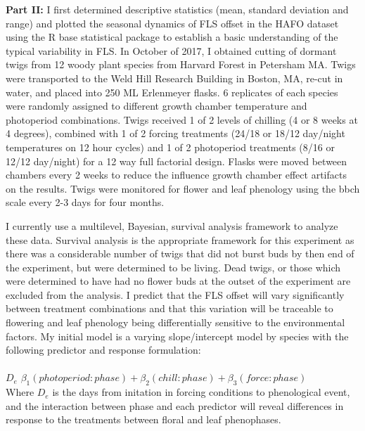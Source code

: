\documentclass{article}\usepackage[]{graphicx}\usepackage[]{color}
\begin{document}
\indent\textbf{Part II:} I first determined descriptive statistics (mean, standard deviation and range) and plotted the seasonal dynamics of FLS offset in the HAFO dataset using the R base statistical package to establish a basic understanding of the typical variability in FLS. In October of 2017, I obtained cutting of dormant twigs from 12 woody plant species from Harvard Forest in Petersham MA. Twigs were transported to the Weld Hill Research Building in Boston, MA, re-cut in water, and placed into 250 ML Erlenmeyer flasks. 6 replicates of each species were randomly assigned to different growth chamber temperature and photoperiod combinations. Twigs received 1 of 2 levels of chilling (4 or 8 weeks at 4 degrees), combined with 1 of 2 forcing treatments (24/18 or 18/12 day/night temperatures on 12 hour cycles) and 1 of 2 photoperiod treatments (8/16 or 12/12 day/night) for a 12 way full factorial design. Flasks were moved between chambers every 2 weeks to reduce the influence growth chamber effect artifacts on the results. Twigs were monitored for flower and leaf phenology using the bbch scale \citep{Finn2007} every 2-3 days for four months.
\par I currently  use a multilevel, Bayesian, survival analysis framework to analyze these data. Survival analysis is the appropriate framework for this experiment as there was a considerable number of twigs that did not burst buds by then end of the experiment, but were determined to be living. Dead twigs, or those which were determined to have had no flower buds at the outset of the experiment are excluded from the analysis. I predict that the FLS offset will vary significantly between treatment combinations and that this variation will be traceable to flowering and leaf phenology being differentially sensitive to the environmental factors. My initial model is a varying slope/intercept model by species with the following predictor and response formulation:\\
\\
$D_e$ \Leftarrow $\beta_1(photoperiod:phase)+\beta_2(chill:phase)+\beta_3 (force:phase) $\\

Where $D_e$ is the days from initation in forcing conditions to phenological event, and the interaction between phase and each predictor will reveal differences in response to the treatments between floral and leaf phenophases.\\
\end{document}
